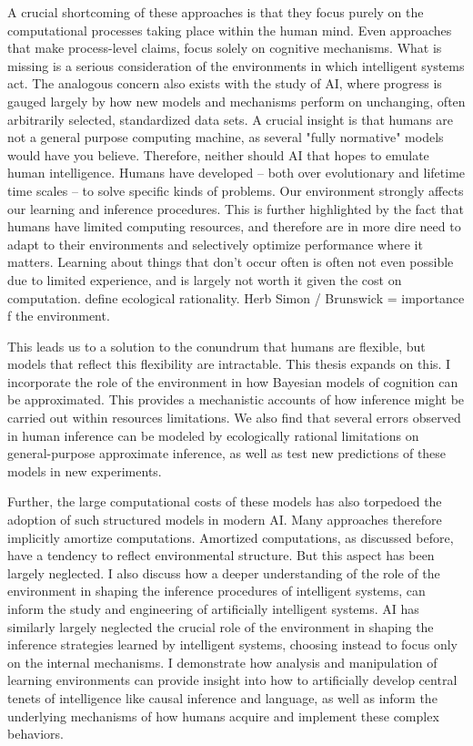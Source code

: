 A crucial shortcoming of these approaches is that they focus purely on the computational processes taking place within the human mind. Even approaches that make process-level claims, focus solely on cognitive mechanisms. What is missing is a serious consideration of the environments in which intelligent systems act. The analogous concern also exists with the study of AI, where progress is gauged largely by how new models and mechanisms perform on unchanging, often arbitrarily selected, standardized data sets. A crucial insight is that humans are not a general purpose computing machine, as several "fully normative" models would have you believe. Therefore, neither should AI that hopes to emulate human intelligence. Humans have developed -- both over evolutionary and lifetime time scales -- to solve specific kinds of problems. Our environment strongly affects our learning and inference procedures. This is further highlighted by the fact that humans have limited computing resources, and therefore are in more dire need to adapt to their environments and selectively optimize performance where it matters. Learning about things that don't occur often is often not even possible due to limited experience, and is largely not worth it given the cost on computation.  define ecological rationality.
Herb Simon / Brunswick = importance f the environment.

This leads us to a solution to the conundrum that humans are flexible, but models that reflect this flexibility are intractable. This thesis expands on this. I incorporate the role of the environment in how Bayesian models of cognition can be approximated. This provides a mechanistic accounts of how inference might be carried out within resources limitations. We also find that several errors observed in human inference can be modeled by ecologically rational limitations on general-purpose approximate inference, as well as test new predictions of these models in new experiments.

Further, the large computational costs of these models has also torpedoed the adoption of such structured models in modern AI. Many approaches therefore implicitly amortize computations. Amortized computations, as discussed before, have a tendency to reflect environmental structure. But this aspect has been largely neglected.  I also discuss how a deeper understanding of the role of the environment in shaping the inference procedures of intelligent systems, can inform the study and engineering of artificially intelligent systems. AI has similarly largely neglected the crucial role of the environment in shaping the inference strategies learned by intelligent systems, choosing instead to focus only on the internal mechanisms. I demonstrate how analysis and manipulation of learning environments can provide insight into how to artificially develop central tenets of intelligence like causal inference and language, as well as inform the underlying mechanisms of how humans acquire and implement these complex behaviors.

